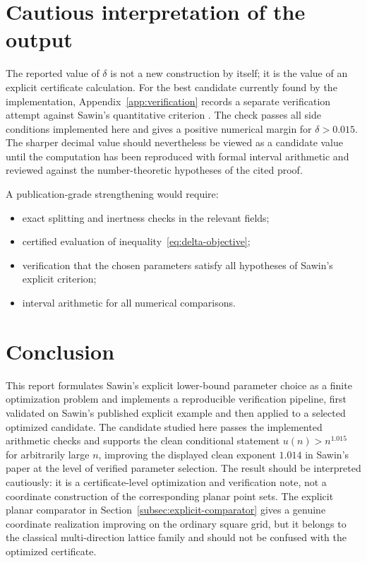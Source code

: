 \documentclass[a4paper,12pt]{article}
\begin{document}
\section{Cautious interpretation of the output}

The reported value of $\delta$ is not a new construction by itself; it is the value of an explicit certificate calculation.  For the best candidate currently found by the implementation, Appendix~\ref{app:verification} records a separate verification attempt against Sawin's quantitative criterion \cite{Sawin2026}.  The check passes all side conditions implemented here and gives a positive numerical margin for $\delta>0.015$.  The sharper decimal value should nevertheless be viewed as a candidate value until the computation has been reproduced with formal interval arithmetic and reviewed against the number-theoretic hypotheses of the cited proof.

A publication-grade strengthening would require:
\begin{itemize}
  \item exact splitting and inertness checks in the relevant fields;
  \item certified evaluation of inequality~\eqref{eq:delta-objective};
  \item verification that the chosen parameters satisfy all hypotheses of Sawin's explicit criterion;
  \item interval arithmetic for all numerical comparisons.
\end{itemize}

\section{Conclusion}

This report formulates Sawin's explicit lower-bound parameter choice as a finite optimization problem and implements a reproducible verification pipeline, first validated on Sawin's published explicit example and then applied to a selected optimized candidate.  The candidate studied here passes the implemented arithmetic checks and supports the clean conditional statement $u(n)>n^{1.015}$ for arbitrarily large $n$, improving the displayed clean exponent $1.014$ in Sawin's paper at the level of verified parameter selection.  The result should be interpreted cautiously: it is a certificate-level optimization and verification note, not a coordinate construction of the corresponding planar point sets.  The explicit planar comparator in Section~\ref{subsec:explicit-comparator} gives a genuine coordinate realization improving on the ordinary square grid, but it belongs to the classical multi-direction lattice family and should not be confused with the optimized certificate.
\end{document}
